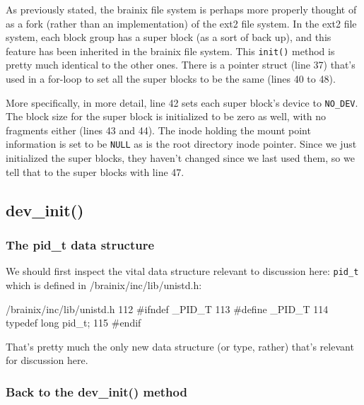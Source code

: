 \documentclass{article}
\begin{document}
As previously stated, the brainix file system is perhaps more properly thought of as a fork (rather than an implementation) of the ext2 file system. In the ext2 file system, each block group has a super block (as a sort of back up), and this feature has been inherited in the brainix file system. This \verb|init()| method is pretty much identical to the other ones. There is a pointer struct (line 37) that's used in a for-loop to set all the super blocks to be the same (lines 40 to 48).

More specifically, in more detail, line 42 sets each super block's device to \verb|NO_DEV|. The block size for the super block is initialized to be zero as well, with no fragments either (lines 43 and 44). The inode holding the mount point information is set to be \verb|NULL| as is the root directory inode pointer. Since we just initialized the super blocks, they haven't changed since we last used them, so we tell that to the super blocks with line 47.

\subsection{dev\_init()}

\subsubsection{The pid\_t data structure}

We should first inspect the vital data structure relevant to discussion here: \verb|pid_t| which is defined in /brainix/inc/lib/unistd.h:\marginpar[pid\_t]{}
\begin{code}{/brainix/inc/lib/unistd.h}
112 #ifndef _PID_T
113 #define _PID_T
114 typedef long pid_t;
115 #endif
\end{code}
That's pretty much the only new data structure (or type, rather) that's relevant for discussion here.

\subsubsection{Back to the dev\_init() method}
\end{document}
